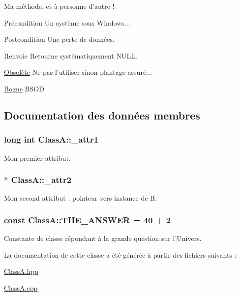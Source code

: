 Ma méthode, et à personne d'autre ! \begin{DoxyPrecond}{Précondition}
Un système sous Windows... 
\end{DoxyPrecond}
\begin{DoxyPostcond}{Postcondition}
Une perte de données.
\end{DoxyPostcond}
\begin{DoxyReturn}{Renvoie}
Retourne systématiquement NULL. 
\end{DoxyReturn}
\begin{Desc}
\item[\hyperlink{deprecated__deprecated000001}{Obsolète}]Ne pas l'utiliser sinon plantage assuré... \end{Desc}
\begin{Desc}
\item[\hyperlink{bug__bug000001}{Bogue}]BSOD \end{Desc}


\subsection{Documentation des données membres}
\hypertarget{class_class_a_ab13fa04135597d1b015171ee7e823804}{
\subsubsection[{\_\-attr1}]{\setlength{\rightskip}{0pt plus 5cm}long int {\bf ClassA::\_\-attr1}}}
\label{class_class_a_ab13fa04135597d1b015171ee7e823804}


Mon premier attribut. \hypertarget{class_class_a_a705a48160d35a8656f1196967a3f11ab}{
\subsubsection[{\_\-attr2}]{$\ast$ {\bf ClassA::\_\-attr2}}}
\label{class_class_a_a705a48160d35a8656f1196967a3f11ab}


Mon second attribut : pointeur vers instance de B. \hypertarget{class_class_a_a37b03b75edb033b486bdbaeb5019cc08}{
\subsubsection[{THE\_\-ANSWER}]{\setlength{\rightskip}{0pt plus 5cm}const {\bf ClassA::THE\_\-ANSWER} = 40 + 2}}
\label{class_class_a_a37b03b75edb033b486bdbaeb5019cc08}


Constante de classe répondant à la grande question sur l'Univers. 

La documentation de cette classe a été générée à partir des fichiers suivants :\begin{DoxyCompactItemize}
\item 
\hyperlink{_class_a_8hpp}{ClassA.hpp}\item 
\hyperlink{_class_a_8cpp}{ClassA.cpp}\end{DoxyCompactItemize}
